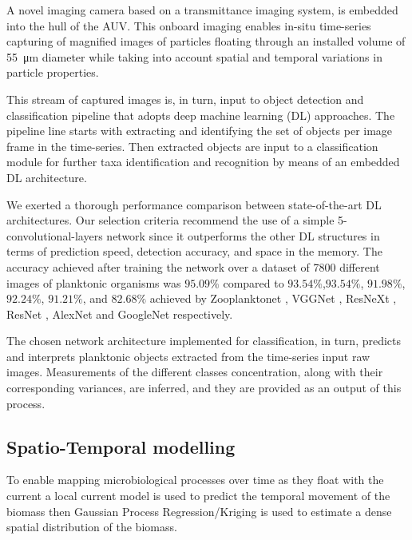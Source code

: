 \documentclass[conference]{IEEEtran}
\begin{document}
A novel imaging camera \cite{Davies2017a} based on a transmittance
imaging system, is embedded into the hull of the AUV. This onboard
imaging enables in-situ time-series capturing of magnified images of
particles floating through an installed volume of \SI{55}{\micro\meter}
diameter while taking into account spatial and temporal variations in
particle properties.

This stream of captured images is, in turn, input to object detection
and classification pipeline that adopts deep machine learning (DL)
approaches. The pipeline line starts with extracting and identifying
the set of objects per image frame in the time-series. Then extracted
objects are input to a classification module for further taxa
identification and recognition by means of an embedded DL
architecture.

We exerted a thorough performance comparison between state-of-the-art
DL architectures. Our selection criteria recommend the use of a simple
5-convolutional-layers network since it outperforms the other DL
structures in terms of prediction speed, detection accuracy, and space
in the memory. The accuracy achieved after training the network over a
dataset of 7800 different images of planktonic organisms was $95.09\%$
compared to $93.54\%$,$93.54\%$, $91.98\%$, $92.24\%$, $91.21\%$, and
$82.68\%$ achieved by Zooplanktonet \cite{dai2016zooplanktonet},
VGGNet \cite{simonyan2014very}, ResNeXt \cite{xie2017aggregated},
ResNet \cite{he2016deep}, AlexNet \cite{krizhevsky2012imagenet} and
GoogleNet \cite{szegedy2015going} respectively.

The chosen network architecture implemented for classification, in
turn, predicts and interprets planktonic objects extracted from the
time-series input raw images. Measurements of the different classes
concentration, along with their corresponding variances, are inferred,
and they are provided as an output of this process.

\subsection{Spatio-Temporal modelling}
To enable mapping microbiological processes over time as they float
with the current a local current model is used to predict the temporal
movement of the biomass then Gaussian Process Regression/Kriging is
used to estimate a dense spatial distribution of the biomass.
\end{document}
